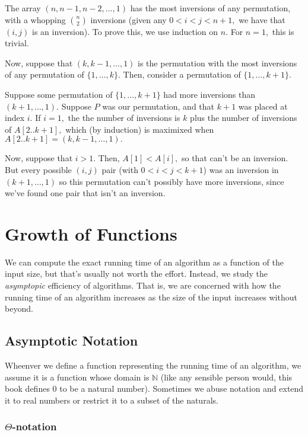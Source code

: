 \documentclass{article}
\begin{document}
The array $(n, n-1, n-2, \dots, 1)$ has the most inversions of any permutation, with a whopping $\binom{n}{2}$ inversions (given any $0 < i < j < n+1,$ we have that $(i, j)$ is an inversion). To prove this, we use induction on $n.$ For $n=1,$ this is trivial.

Now, suppose that $(k, k-1, \dots, 1)$ is the permutation with the most inversions of any permutation of $\{1, \dots, k\}.$ Then, consider a permutation of $\{1, \dots, k+1\}.$ 

Suppose some permutation of $\{1, \dots, k+1\}$ had more inversions than $(k+1, \dots, 1).$ Suppose $P$ was our permutation, and that $k+1$ was placed at index $i.$ If $i=1,$ the the number of inversions is $k$ plus the number of inversions of $A[2..k+1],$ which (by induction) is maximixed when $A[2..k+1] = (k, k-1, \dots, 1).$

Now, suppose that $i > 1.$ Then, $A[1] < A[i],$ so that can't be an inversion. But every possible $(i, j)$ pair (with $0 < i < j < k+1$) was an inversion in $(k+1, \dots, 1)$ so this permutation can't possibly have more inversions, since we've found one pair that isn't an inversion.




\section{Growth of Functions}

We can compute the exact running time of an algorithm as a function of the input size, but that's usually not worth the effort. Instead, we study the \textit{asymptopic} efficiency of algorithms. That is, we are concerned with how the running time of an algorithm increases as the size of the input increases without beyond.

\subsection{Asymptotic Notation}

Wheenver we define a function representing the running time of an algorithm, we assume it is a function whose domain is $\mathbb{N}$ (like any sensible person would, this book defines $0$ to be a natural number). Sometimes we abuse notation and extend it to real numbers or restrict it to a subset of the naturals.

\subsubsection{$\Theta$-notation}
\end{document}
